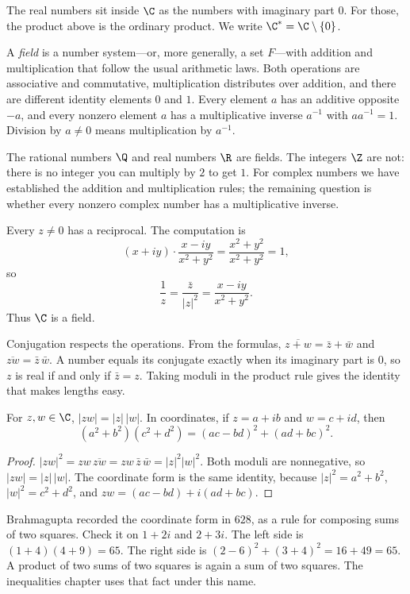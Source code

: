 The real numbers sit inside $\C$ as the numbers with imaginary part $0$. For those, the product above is the ordinary product. We write $\C^*=\C\setminus\{0\}$.

\begin{definitionx}
A \emph{field} is a number system---or, more generally, a set $F$---with addition and multiplication that follow the usual arithmetic laws. Both operations are associative and commutative, multiplication distributes over addition, and there are different identity elements $0$ and $1$. Every element $a$ has an additive opposite $-a$, and every nonzero element $a$ has a multiplicative inverse $a^{-1}$ with $aa^{-1}=1$. Division by $a\ne0$ means multiplication by $a^{-1}$.
\end{definitionx}

The rational numbers $\Q$ and real numbers $\R$ are fields. The integers $\Z$ are not: there is no integer you can multiply by $2$ to get $1$. For complex numbers we have established the addition and multiplication rules; the remaining question is whether every nonzero complex number has a multiplicative inverse.

Every $z\ne0$ has a reciprocal. The computation is
\[
(x+iy)\cdot\frac{x-iy}{x^2+y^2}=\frac{x^2+y^2}{x^2+y^2}=1,
\]
so
\[
\frac1z=\frac{\bar z}{|z|^2}=\frac{x-iy}{x^2+y^2}.
\]
Thus $\C$ is a field.

Conjugation respects the operations. From the formulas, $\overline{z+w}=\bar z+\bar w$ and $\overline{zw}=\bar z\,\bar w$. A number equals its conjugate exactly when its imaginary part is $0$, so $z$ is real if and only if $\bar z=z$. Taking moduli in the product rule gives the identity that makes lengths easy.

\begin{propositionx}
For $z,w\in\C$, $|zw|=|z|\,|w|$. In coordinates, if $z=a+ib$ and $w=c+id$, then
\[
(a^2+b^2)(c^2+d^2)=(ac-bd)^2+(ad+bc)^2.
\]
\end{propositionx}
\begin{proof}
$|zw|^2=zw\,\overline{zw}=zw\,\bar z\,\bar w=|z|^2|w|^2$. Both moduli are nonnegative, so $|zw|=|z|\,|w|$. The coordinate form is the same identity, because $|z|^2=a^2+b^2$, $|w|^2=c^2+d^2$, and $zw=(ac-bd)+i(ad+bc)$.
\end{proof}

Brahmagupta recorded the coordinate form in $628$, as a rule for composing sums of two squares. Check it on $1+2i$ and $2+3i$. The left side is $(1+4)(4+9)=65$. The right side is $(2-6)^2+(3+4)^2=16+49=65$. A product of two sums of two squares is again a sum of two squares. The inequalities chapter uses that fact under this name.

